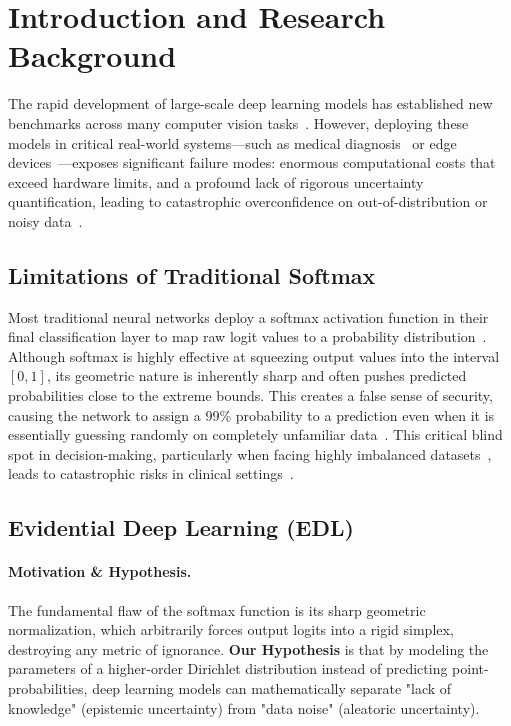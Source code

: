 \documentclass[letterpaper]{article} %
\begin{document}
\section{Introduction and Research Background}\label{sec:intro}

The rapid development of large-scale deep learning models has established new benchmarks across many computer vision tasks~\cite{he2016deep, dosovitskiy2021image}. However, deploying these models in critical real-world systems---such as medical diagnosis~\cite{esteva2017dermatologist} or edge devices~\cite{deng2020edge}---exposes significant failure modes: enormous computational costs that exceed hardware limits, and a profound lack of rigorous uncertainty quantification, leading to catastrophic overconfidence on out-of-distribution or noisy data~\cite{abdar2021review, guo2017calibration}.

\subsection{Limitations of Traditional Softmax}

Most traditional neural networks deploy a softmax activation function in their final classification layer to map raw logit values to a probability distribution~\cite{guo2017calibration, minderer2021revisiting}. Although softmax is highly effective at squeezing output values into the interval $[0, 1]$, its geometric nature is inherently sharp and often pushes predicted probabilities close to the extreme bounds. This creates a false sense of security, causing the network to assign a 99\% probability to a prediction even when it is essentially guessing randomly on completely unfamiliar data~\cite{lakshminarayanan2017simple}. This critical blind spot in decision-making, particularly when facing highly imbalanced datasets~\cite{johnson2019survey}, leads to catastrophic risks in clinical settings~\cite{begoli2019need}.

\subsection{Evidential Deep Learning (EDL)}

\paragraph{Motivation \& Hypothesis.} The fundamental flaw of the softmax function is its sharp geometric normalization, which arbitrarily forces output logits into a rigid simplex, destroying any metric of ignorance. \textbf{Our Hypothesis} is that by modeling the parameters of a higher-order Dirichlet distribution instead of predicting point-probabilities, deep learning models can mathematically separate "lack of knowledge" (epistemic uncertainty) from "data noise" (aleatoric uncertainty).
\end{document}
